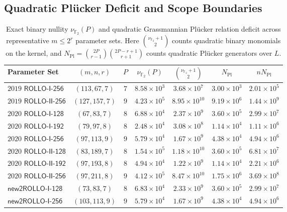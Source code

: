 \documentclass[11pt,a4paper]{article}
\theoremstyle{definition}
\theoremstyle{remark}
\newcommand{\Ftwo}{\mathbb{F}_2}
\begin{document}
\subsection{Quadratic Pl\"{u}cker Deficit and Scope Boundaries}
\begin{table}[t]
\centering
\caption{Exact binary nullity $\nu_{\Ftwo}(P)$ and quadratic Grassmannian Pl\"{u}cker relation deficit across representative $m \le 2^r$ parameter sets. Here $\binom{\nu_{\Ftwo}+1}{2}$ counts quadratic binary monomials on the kernel, and $N_{\text{Pl}} = \binom{2P}{r-1}\binom{2P-r+1}{r+1}$ counts quadratic Pl\"{u}cker generators over $L$.}
\label{tab:deg2-deficit}
\setlength{\tabcolsep}{4.8pt}
\begin{tabular}{@{}lcccccc@{}}
\toprule
\textbf{Parameter Set} & \textbf{$(m, n, r)$} & \textbf{$P$} & \textbf{$\nu_{\Ftwo}(P)$} & \textbf{$\binom{\nu_{\Ftwo}+1}{2}$} & \textbf{$N_{\text{Pl}}$} & \textbf{$n N_{\text{Pl}}$} \\
\midrule
$2019$ $\mathsf{ROLLO\text{-}I\text{-}256}$ & $(113, 67, 7)$ & $7$ & $8.58{\times}10^3$ & $3.68{\times}10^7$ & $3.00{\times}10^3$ & $2.01{\times}10^5$ \\
$2019$ $\mathsf{ROLLO\text{-}II\text{-}256}$ & $(127, 157, 7)$ & $9$ & $4.23{\times}10^5$ & $8.95{\times}10^{10}$ & $9.19{\times}10^6$ & $1.44{\times}10^9$ \\
$2020$ $\mathsf{ROLLO\text{-}I\text{-}128}$ & $(67, 83, 7)$ & $8$ & $6.88{\times}10^4$ & $2.37{\times}10^9$ & $3.60{\times}10^5$ & $2.99{\times}10^7$ \\
$2020$ $\mathsf{ROLLO\text{-}I\text{-}192}$ & $(79, 97, 8)$ & $8$ & $2.48{\times}10^4$ & $3.08{\times}10^8$ & $1.14{\times}10^4$ & $1.11{\times}10^6$ \\
$2020$ $\mathsf{ROLLO\text{-}I\text{-}256}$ & $(97, 113, 9)$ & $9$ & $5.79{\times}10^4$ & $1.67{\times}10^9$ & $4.38{\times}10^4$ & $4.94{\times}10^6$ \\
$2020$ $\mathsf{ROLLO\text{-}II\text{-}128}$ & $(83, 189, 7)$ & $8$ & $1.54{\times}10^5$ & $1.18{\times}10^{10}$ & $3.60{\times}10^5$ & $6.81{\times}10^7$ \\
$2020$ $\mathsf{ROLLO\text{-}II\text{-}192}$ & $(97, 193, 8)$ & $8$ & $4.94{\times}10^4$ & $1.22{\times}10^9$ & $1.14{\times}10^4$ & $2.21{\times}10^6$ \\
$2020$ $\mathsf{ROLLO\text{-}II\text{-}256}$ & $(97, 211, 8)$ & $9$ & $4.12{\times}10^5$ & $8.47{\times}10^{10}$ & $1.75{\times}10^6$ & $3.69{\times}10^8$ \\
$\mathsf{new2ROLLO\text{-}I\text{-}128}$~\cite{BBC+20} & $(73, 83, 7)$ & $8$ & $6.83{\times}10^4$ & $2.33{\times}10^9$ & $3.60{\times}10^5$ & $2.99{\times}10^7$ \\
$\mathsf{new2ROLLO\text{-}I\text{-}256}$~\cite{BBC+20} & $(103, 113, 9)$ & $9$ & $5.79{\times}10^4$ & $1.67{\times}10^9$ & $4.38{\times}10^4$ & $4.94{\times}10^6$ \\
\bottomrule
\end{tabular}
\end{table}
\end{document}
